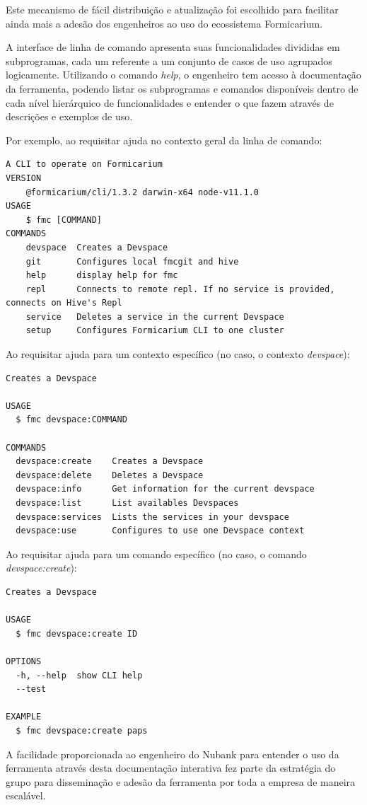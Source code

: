 	Este mecanismo de fácil distribuição e atualização foi escolhido para facilitar ainda mais a adesão dos engenheiros ao uso do ecossistema Formicarium.

A interface de linha de comando apresenta suas funcionalidades divididas em subprogramas, cada um referente a um conjunto de casos de uso agrupados logicamente. Utilizando o comando \textit{help}, o engenheiro tem acesso à documentação da ferramenta, podendo listar os subprogramas e comandos disponíveis dentro de cada nível hierárquico de funcionalidades e entender o que fazem através de descrições e exemplos de uso.

Por exemplo, ao requisitar ajuda no contexto geral da linha de comando:

\begin{verbatim}
A CLI to operate on Formicarium
VERSION
    @formicarium/cli/1.3.2 darwin-x64 node-v11.1.0
USAGE
    $ fmc [COMMAND]
COMMANDS
    devspace  Creates a Devspace
    git       Configures local fmcgit and hive
    help      display help for fmc
    repl      Connects to remote repl. If no service is provided, connects on Hive's Repl
    service   Deletes a service in the current Devspace
    setup     Configures Formicarium CLI to one cluster
\end{verbatim}

Ao requisitar ajuda para um contexto específico (no caso, o contexto \textit{devspace}):
\begin{verbatim}
Creates a Devspace

USAGE
  $ fmc devspace:COMMAND

COMMANDS
  devspace:create    Creates a Devspace
  devspace:delete    Deletes a Devspace
  devspace:info      Get information for the current devspace
  devspace:list      List availables Devspaces
  devspace:services  Lists the services in your devspace
  devspace:use       Configures to use one Devspace context
\end{verbatim}


Ao requisitar ajuda para um comando específico (no caso, o comando \textit{devspace:create}):
\begin{verbatim}
Creates a Devspace

USAGE
  $ fmc devspace:create ID

OPTIONS
  -h, --help  show CLI help
  --test

EXAMPLE
  $ fmc devspace:create paps
\end{verbatim}


A facilidade proporcionada ao engenheiro do Nubank para entender o uso da ferramenta através desta documentação interativa fez parte da estratégia do grupo para disseminação e adesão da ferramenta por toda a empresa de maneira escalável.

